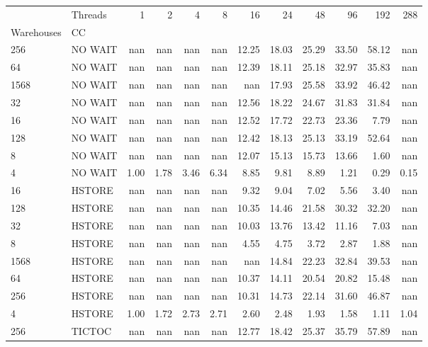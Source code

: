 \begin{tabular}{llrrrrrrrrrr}
\toprule
     & Threads &  1   &  2   &  4   &  8   &   16  &   24  &   48  &   96  &   192 &  288 \\
Warehouses & CC &      &      &      &      &       &       &       &       &       &      \\
\midrule
256  & NO WAIT &  nan &  nan &  nan &  nan & 12.25 & 18.03 & 25.29 & 33.50 & 58.12 &  nan \\
64   & NO WAIT &  nan &  nan &  nan &  nan & 12.39 & 18.11 & 25.18 & 32.97 & 35.83 &  nan \\
1568 & NO WAIT &  nan &  nan &  nan &  nan &   nan & 17.93 & 25.58 & 33.92 & 46.42 &  nan \\
32   & NO WAIT &  nan &  nan &  nan &  nan & 12.56 & 18.22 & 24.67 & 31.83 & 31.84 &  nan \\
16   & NO WAIT &  nan &  nan &  nan &  nan & 12.52 & 17.72 & 22.73 & 23.36 &  7.79 &  nan \\
128  & NO WAIT &  nan &  nan &  nan &  nan & 12.42 & 18.13 & 25.13 & 33.19 & 52.64 &  nan \\
8    & NO WAIT &  nan &  nan &  nan &  nan & 12.07 & 15.13 & 15.73 & 13.66 &  1.60 &  nan \\
4    & NO WAIT & 1.00 & 1.78 & 3.46 & 6.34 &  8.85 &  9.81 &  8.89 &  1.21 &  0.29 & 0.15 \\
16   & HSTORE &  nan &  nan &  nan &  nan &  9.32 &  9.04 &  7.02 &  5.56 &  3.40 &  nan \\
128  & HSTORE &  nan &  nan &  nan &  nan & 10.35 & 14.46 & 21.58 & 30.32 & 32.20 &  nan \\
32   & HSTORE &  nan &  nan &  nan &  nan & 10.03 & 13.76 & 13.42 & 11.16 &  7.03 &  nan \\
8    & HSTORE &  nan &  nan &  nan &  nan &  4.55 &  4.75 &  3.72 &  2.87 &  1.88 &  nan \\
1568 & HSTORE &  nan &  nan &  nan &  nan &   nan & 14.84 & 22.23 & 32.84 & 39.53 &  nan \\
64   & HSTORE &  nan &  nan &  nan &  nan & 10.37 & 14.11 & 20.54 & 20.82 & 15.48 &  nan \\
256  & HSTORE &  nan &  nan &  nan &  nan & 10.31 & 14.73 & 22.14 & 31.60 & 46.87 &  nan \\
4    & HSTORE & 1.00 & 1.72 & 2.73 & 2.71 &  2.60 &  2.48 &  1.93 &  1.58 &  1.11 & 1.04 \\
256  & TICTOC &  nan &  nan &  nan &  nan & 12.77 & 18.42 & 25.37 & 35.79 & 57.89 &  nan \\

\end{tabular}

